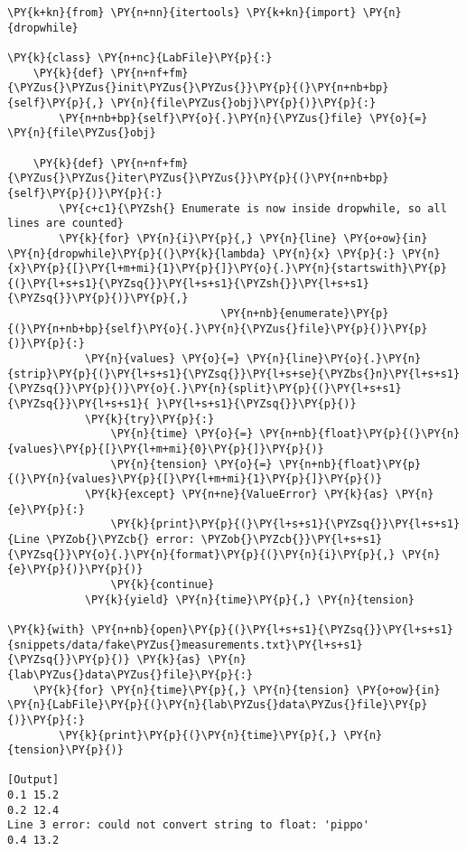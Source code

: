 \begin{Verbatim}[label=\makebox{\url{https://github.com/lucabaldini/cmepda/tree/master/slides/latex/snippets/file\_iterator\_2.py}},commandchars=\\\{\}]
\PY{k+kn}{from} \PY{n+nn}{itertools} \PY{k+kn}{import} \PY{n}{dropwhile}

\PY{k}{class} \PY{n+nc}{LabFile}\PY{p}{:}
    \PY{k}{def} \PY{n+nf+fm}{\PYZus{}\PYZus{}init\PYZus{}\PYZus{}}\PY{p}{(}\PY{n+nb+bp}{self}\PY{p}{,} \PY{n}{file\PYZus{}obj}\PY{p}{)}\PY{p}{:}
        \PY{n+nb+bp}{self}\PY{o}{.}\PY{n}{\PYZus{}file} \PY{o}{=} \PY{n}{file\PYZus{}obj}
       
    \PY{k}{def} \PY{n+nf+fm}{\PYZus{}\PYZus{}iter\PYZus{}\PYZus{}}\PY{p}{(}\PY{n+nb+bp}{self}\PY{p}{)}\PY{p}{:}
        \PY{c+c1}{\PYZsh{} Enumerate is now inside dropwhile, so all lines are counted}
        \PY{k}{for} \PY{n}{i}\PY{p}{,} \PY{n}{line} \PY{o+ow}{in} \PY{n}{dropwhile}\PY{p}{(}\PY{k}{lambda} \PY{n}{x} \PY{p}{:} \PY{n}{x}\PY{p}{[}\PY{l+m+mi}{1}\PY{p}{]}\PY{o}{.}\PY{n}{startswith}\PY{p}{(}\PY{l+s+s1}{\PYZsq{}}\PY{l+s+s1}{\PYZsh{}}\PY{l+s+s1}{\PYZsq{}}\PY{p}{)}\PY{p}{,}
                                 \PY{n+nb}{enumerate}\PY{p}{(}\PY{n+nb+bp}{self}\PY{o}{.}\PY{n}{\PYZus{}file}\PY{p}{)}\PY{p}{)}\PY{p}{:}
            \PY{n}{values} \PY{o}{=} \PY{n}{line}\PY{o}{.}\PY{n}{strip}\PY{p}{(}\PY{l+s+s1}{\PYZsq{}}\PY{l+s+se}{\PYZbs{}n}\PY{l+s+s1}{\PYZsq{}}\PY{p}{)}\PY{o}{.}\PY{n}{split}\PY{p}{(}\PY{l+s+s1}{\PYZsq{}}\PY{l+s+s1}{ }\PY{l+s+s1}{\PYZsq{}}\PY{p}{)}
            \PY{k}{try}\PY{p}{:}
                \PY{n}{time} \PY{o}{=} \PY{n+nb}{float}\PY{p}{(}\PY{n}{values}\PY{p}{[}\PY{l+m+mi}{0}\PY{p}{]}\PY{p}{)}
                \PY{n}{tension} \PY{o}{=} \PY{n+nb}{float}\PY{p}{(}\PY{n}{values}\PY{p}{[}\PY{l+m+mi}{1}\PY{p}{]}\PY{p}{)}
            \PY{k}{except} \PY{n+ne}{ValueError} \PY{k}{as} \PY{n}{e}\PY{p}{:}
                \PY{k}{print}\PY{p}{(}\PY{l+s+s1}{\PYZsq{}}\PY{l+s+s1}{Line \PYZob{}\PYZcb{} error: \PYZob{}\PYZcb{}}\PY{l+s+s1}{\PYZsq{}}\PY{o}{.}\PY{n}{format}\PY{p}{(}\PY{n}{i}\PY{p}{,} \PY{n}{e}\PY{p}{)}\PY{p}{)}
                \PY{k}{continue}
            \PY{k}{yield} \PY{n}{time}\PY{p}{,} \PY{n}{tension}

\PY{k}{with} \PY{n+nb}{open}\PY{p}{(}\PY{l+s+s1}{\PYZsq{}}\PY{l+s+s1}{snippets/data/fake\PYZus{}measurements.txt}\PY{l+s+s1}{\PYZsq{}}\PY{p}{)} \PY{k}{as} \PY{n}{lab\PYZus{}data\PYZus{}file}\PY{p}{:}
    \PY{k}{for} \PY{n}{time}\PY{p}{,} \PY{n}{tension} \PY{o+ow}{in} \PY{n}{LabFile}\PY{p}{(}\PY{n}{lab\PYZus{}data\PYZus{}file}\PY{p}{)}\PY{p}{:}
        \PY{k}{print}\PY{p}{(}\PY{n}{time}\PY{p}{,} \PY{n}{tension}\PY{p}{)}

[Output]
0.1 15.2
0.2 12.4
Line 3 error: could not convert string to float: 'pippo'
0.4 13.2
\end{Verbatim}